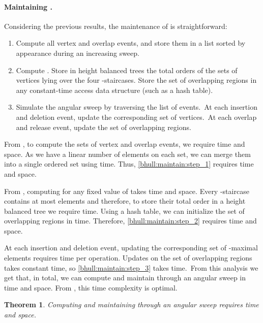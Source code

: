 \documentclass[11pt,letterpaper,english]{article}
\newtheorem{theorem}{Theorem}
\theoremstyle{definition}
\begin{document}
\paragraph{Maintaining .}

Considering the previous results, the maintenance of  is
straightforward:
\begin{enumerate}
\item \label{bhull:maintain:step_1} Compute all vertex and overlap
  events, and store them in a list sorted by appearance during an
  increasing sweep.
\item \label{bhull:maintain:step_2} Compute
  . Store in height balanced trees the total
  orders of the sets of vertices lying over the four
  -staircases. Store the set of overlapping regions in any
  constant-time access data structure (such as a hash table).
\item \label{bhull:maintain:step_3} Simulate the angular sweep by
  traversing the list of events.~At each insertion and deletion event,
  update the corresponding set of vertices.~At each overlap and
  release event, update the set of overlapping regions.
\end{enumerate}

From , to
compute the sets of vertex and overlap events, we require
 time and  space.
As we have a linear number of elements on each set,
we can merge them into a single ordered set using
 time. Thus,
\cref{bhull:maintain:step_1} requires  time and 
space.

From , computing  for any
fixed value of  takes  time and 
space. Every -staircase contains at most  elements and
therefore, to store their total order in a height balanced tree we
require  time.
Using a hash table, we can initialize the set of overlapping regions
in  time. Therefore,
\cref{bhull:maintain:step_2} requires  time and 
space.

At each insertion and deletion event, updating the corresponding set
of -maximal elements requires  time per
operation. Updates on the set of overlapping regions takes constant
time, so \cref{bhull:maintain:step_3} takes  time.~From
this analysis we get that, in total, we can compute and maintain
 through an angular sweep in  time and 
space.  From , this time complexity
is optimal.

\begin{theorem}
  Computing and maintaining  through an angular sweep
  requires  time and  space.
\end{theorem}
\end{document}
